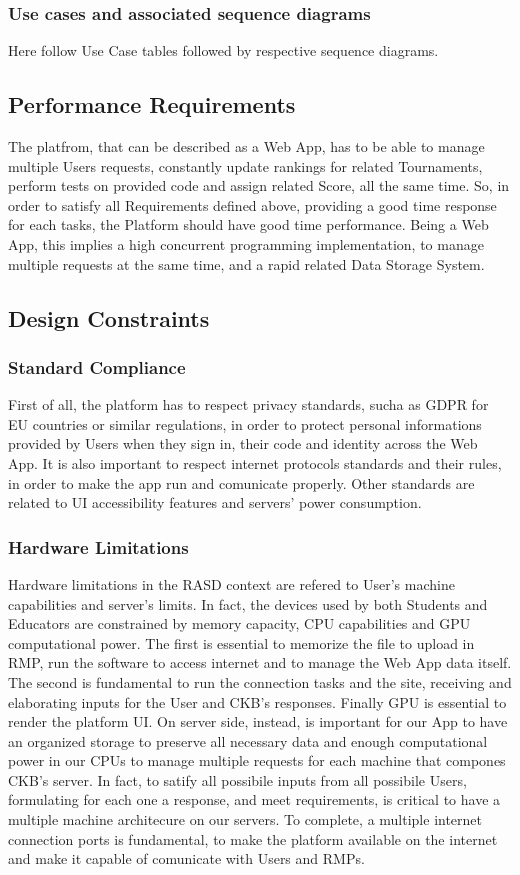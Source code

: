 \subsubsection{Use cases and associated sequence diagrams}
Here follow Use Case tables followed by respective sequence diagrams.


\subsection{Performance Requirements}
The platfrom, that can be described as a Web App, has to be able to manage multiple Users requests, constantly update rankings for related Tournaments, perform tests on provided code and assign related Score, all the same time. So, in order to satisfy all Requirements defined above, providing a good time response for each tasks, the Platform should have good time performance. Being a Web App, this implies a high concurrent programming implementation, to manage multiple requests at the same time, and a rapid related Data Storage System. 
\subsection{Design Constraints}

\subsubsection{Standard Compliance}
First of all, the platform has to respect privacy standards, sucha as GDPR for EU countries or similar regulations, in order to protect personal informations provided by Users when they sign in, their code and identity across the Web App. It is also important to respect internet protocols standards and their rules, in order to make the app run and comunicate properly. Other standards are related to UI accessibility features and servers' power consumption. 
\subsubsection{Hardware Limitations}
Hardware limitations in the RASD context are refered to User's machine capabilities and server's limits. In fact, the devices used by both Students and Educators are constrained by memory capacity, CPU capabilities and GPU computational power. The first is essential to memorize the file to upload in RMP, run the software to access internet and to manage the Web App data itself. The second is fundamental to run the connection tasks and the site, receiving and elaborating inputs for the User and CKB's responses. Finally GPU is essential to render the platform UI. On server side, instead, is important for our App to have an organized storage to preserve all necessary data and enough computational power in our CPUs to manage multiple requests for each machine that compones CKB's server. In fact, to satify all possibile inputs from all possibile Users, formulating for each one a response, and meet requirements, is critical to have a multiple machine architecure on our servers. To complete, a multiple internet connection ports is fundamental, to make the platform available on the internet and make it capable of comunicate with Users and RMPs.
